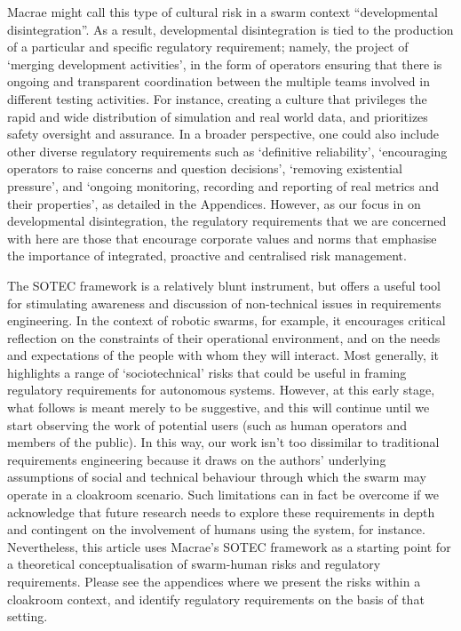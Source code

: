 \documentclass[lettersize,journal]{IEEEtran}
\begin{document}
Macrae \cite{macrae2021learning} might call this type of cultural risk in a swarm context ``developmental disintegration”. As a result, developmental disintegration is tied to the production of a particular and specific regulatory requirement; namely, the project of `merging development activities’, in the form of operators ensuring that there is ongoing and transparent coordination between the multiple teams involved in different testing activities. For instance, creating a culture that privileges the rapid and wide distribution of simulation and real world data, and prioritizes safety oversight and assurance. In a broader perspective, one could also include other diverse regulatory requirements such as `definitive reliability’, `encouraging operators to raise concerns and question decisions’, `removing existential pressure’, and `ongoing monitoring, recording and reporting of real metrics and their properties’, as detailed in the Appendices. However, as our focus in on developmental disintegration, the regulatory requirements that we are concerned with here are those that encourage corporate values and norms that emphasise the importance of integrated, proactive and centralised risk management.

The SOTEC framework is a relatively blunt instrument, but offers a useful tool for stimulating awareness and discussion of non-technical issues in requirements engineering. In the context of robotic swarms, for example, it encourages critical reflection on the constraints of their operational environment, and on the needs and expectations of the people with whom they will interact. Most generally, it highlights a range of `sociotechnical’ risks that could be useful in framing regulatory requirements for autonomous systems. However, at this early stage, what follows is meant merely to be suggestive, and this will continue until we start observing the work of potential users (such as human operators and members of the public). In this way, our work isn’t too dissimilar to traditional requirements engineering because it draws on the authors’ underlying assumptions of social and technical behaviour through which the swarm may operate in a cloakroom scenario. Such limitations can in fact be overcome if we acknowledge that future research needs to explore these requirements in depth and contingent on the involvement of humans using the system, for instance. Nevertheless, this article uses Macrae’s SOTEC framework \cite{macrae2021learning} as a starting point for a theoretical conceptualisation of swarm-human risks and regulatory requirements. Please see the appendices where we present the risks within a cloakroom context, and identify regulatory requirements on the basis of that setting.
\end{document}
